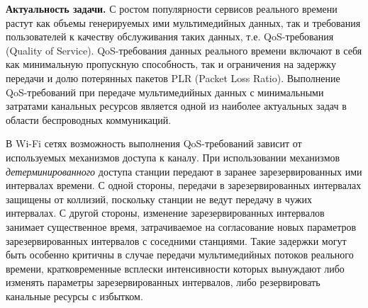 
\textbf{Актуальность задачи.} С ростом популярности сервисов реального времени растут как объемы генерируемых ими мультимедийных данных, так и требования пользователей к качеству обслуживания таких данных, т.е. QoS-требования (Quality of Service).  QoS-требования данных реального времени включают в себя как минимальную пропускную способность, так и ограничения на задержку передачи и долю потерянных пакетов PLR (Packet Loss Ratio). Выполнение QoS-требований при передаче мультимедийных данных с минимальными затратами канальных ресурсов является одной из наиболее актуальных задач в области беспроводных коммуникаций.




В Wi-Fi сетях возможность выполнения QoS-требований зависит от используемых механизмов доступа к каналу.   При использовании механизмов \textit{детерминированного} доступа станции передают в заранее зарезервированных ими интервалах времени. С одной стороны, передачи в зарезервированных интервалах защищены от коллизий, поскольку станции не ведут передачу в чужих интервалах. С другой стороны, изменение зарезервированных интервалов занимает существенное время, затрачиваемое на согласование новых параметров зарезервированных интервалов с соседними станциями. Такие задержки могут быть особенно критичны в случае передачи мультимедийных потоков реального времени, кратковременные всплески интенсивности которых вынуждают либо изменять параметры зарезервированных интервалов, либо резервировать канальные ресурсы с избытком.

